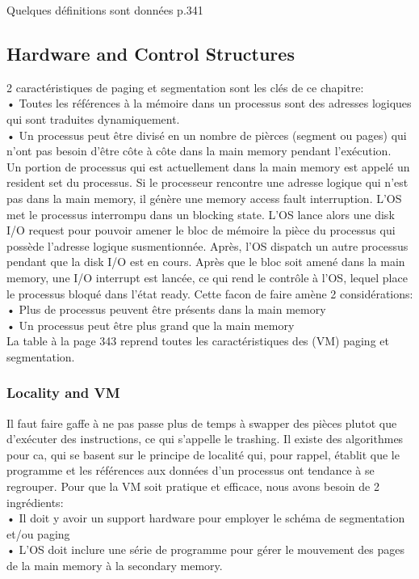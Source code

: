 Quelques définitions sont données p.341
\subsection{Hardware and Control Structures}
2 caractéristiques de paging et segmentation sont les clés de ce chapitre: \\
• Toutes les références à la mémoire dans un processus sont des adresses logiques qui sont traduites dynamiquement.\\
• Un processus peut être divisé en un nombre de pièrces (segment ou pages) qui n’ont pas besoin d’être côte à côte dans la main memory pendant l’exécution.\\
Un portion de processus qui est actuellement dans la main memory est appelé un resident set du processus. Si le processeur rencontre une adresse logique qui n’est pas dans la main memory, il génère une memory access fault interruption. L’OS met le processus interrompu dans un blocking state. L’OS lance alors une disk I/O request pour pouvoir amener le bloc de mémoire la pièce du processus qui possède l’adresse logique susmentionnée. Après, l’OS dispatch un autre processus pendant que la disk I/O est en cours. Après que le bloc soit amené dans la main memory, une I/O interrupt est lancée, ce qui rend le contrôle à l’OS, lequel place le processus bloqué dans l’état ready.
Cette facon de faire amène 2 considérations:\\
• Plus de processus peuvent être présents dans la main memory \\
• Un processus peut être plus grand que la main memory\\
La table à la page 343 reprend toutes les caractéristiques des (VM) paging et segmentation.
\subsubsection{Locality and VM}
Il faut faire gaffe à ne pas passe plus de temps à swapper des pièces plutot que d’exécuter des instructions, ce qui s’appelle le trashing. Il existe des algorithmes pour ca, qui se basent sur le principe de localité qui, pour rappel, établit que le programme et les références aux données d’un processus ont tendance à se regrouper. Pour que la VM soit pratique et efficace, nous avons besoin de 2 ingrédients:\\
• Il doit y avoir un support hardware pour employer le schéma de segmentation et/ou paging\\
• L’OS doit inclure une série de programme pour gérer le mouvement des pages de la main memory à la secondary memory.\\
